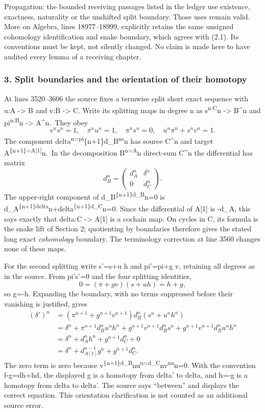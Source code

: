 \documentclass[11pt]{article}
\begin{document}
Propagation: the bounded receiving passages listed in the ledger use existence, exactness, naturality or the unshifted split boundary. Those uses remain valid. More on Algebra, lines 18977--18999, explicitly retains the same unsigned cohomology identification and snake boundary, which agrees with (2.1). Its conventions must be kept, not silently changed. No claim is made here to have audited every lemma of a receiving chapter.

\subsubsection{3. Split boundaries and the orientation of their homotopy}\label{split-boundaries-and-the-orientation-of-their-homotopy}

At lines 3520--3606 the source fixes a termwise split short exact sequence with u:A -\textgreater{} B and v:B -\textgreater{} C. Write its splitting maps in degree n as s\textsuperscript{n:C}n -\textgreater{} B\^{}n and pi\textsuperscript{n:B}n -\textgreater{} A\^{}n.~They obey \[
v^ns^n=1,\quad \pi^nu^n=1,\quad \pi^ns^n=0,\quad
u^n\pi^n+s^nv^n=1.
\] The component delta\textsuperscript{n=pi}\{n+1\}d\_B\textsuperscript{ns}n has source C\^{}n and target A\textsuperscript{\{n+1\}=A{[}1{]}}n.~In the decomposition B\textsuperscript{n=A}n direct-sum C\^{}n the differential has matrix \[
d_B^n=
\begin{pmatrix}d_A^n&\delta^n\\0&d_C^n\end{pmatrix}.
\] The upper-right component of d\_B\textsuperscript{\{n+1\}d\_B}n=0 is d\_A\textsuperscript{\{n+1\}delta}n+delta\textsuperscript{\{n+1\}d\_C}n=0. Since the differential of A{[}1{]} is -d\_A, this says exactly that delta:C -\textgreater{} A{[}1{]} is a cochain map. On cycles in C, its formula is the snake lift of Section 2; quotienting by boundaries therefore gives the stated long exact \emph{cohomology} boundary. The terminology correction at line 3560 changes none of these maps.

For the second splitting write s'=s+u h and pi'=pi+g v, retaining all degrees as in the source. From pi's'=0 and the four splitting identities, \[
0=(\pi+gv)(s+uh)=h+g,
\] so g=-h. Expanding the boundary, with no terms suppressed before their vanishing is justified, gives \[
\begin{aligned}
(\delta')^n
&=(\pi^{n+1}+g^{n+1}v^{n+1})d_B^n(s^n+u^nh^n)\\
&=\delta^n+
  \pi^{n+1}d_B^nu^nh^n+
  g^{n+1}v^{n+1}d_B^ns^n+
  g^{n+1}v^{n+1}d_B^nu^nh^n\\
&=\delta^n+d_A^nh^n+g^{n+1}d_C^n+0\\
&=\delta^n+d_{A[1]}^{n-1}g^n+g^{n+1}d_C^n .
\end{aligned}
\] The zero term is zero because v\textsuperscript{\{n+1\}d\_B}nu\textsuperscript{n=d\_C}nv\textsuperscript{nu}n=0. With the convention f-g=dh+hd, the displayed g is a homotopy from delta' to delta, and h=-g is a homotopy from delta to delta'. The source says ``between'' and displays the correct equation. This orientation clarification is not counted as an additional source error.
\end{document}
